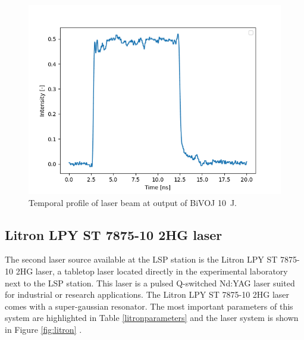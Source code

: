 \begin{figure}[h]
    \centering
    \includegraphics[width=0.6\linewidth]{img/temporal_profile_bivoj.png}
    \caption{Temporal profile of laser beam at output of BiVOJ \SI{10}{\joule}.}
    \label{fig:temporalprofile}
\end{figure}

\subsection{Litron LPY ST 7875-10 2HG laser}

The second laser source available at the LSP station is the Litron LPY ST 7875-10 2HG laser, a tabletop laser located directly in the experimental laboratory next to the LSP station. This laser is a pulsed Q-switched Nd:YAG laser suited for industrial or research applications. The Litron  LPY ST 7875-10 2HG laser comes with a super-gaussian resonator. The most important parameters of this system are highlighted in Table \ref{litronparameters} and the laser system is shown in Figure \ref{fig:litron} \cite{litron}. 


